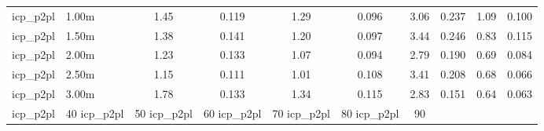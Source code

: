 \begin{tabular}{llcccccccc}
icp\_p2pl & 1.00m & 1.45 & 0.119 & 1.29 & 0.096 & 3.06 & 0.237 & 1.09 & 0.100 \\
icp\_p2pl & 1.50m & 1.38 & 0.141 & 1.20 & 0.097 & 3.44 & 0.246 & 0.83 & 0.115 \\
icp\_p2pl & 2.00m & 1.23 & 0.133 & 1.07 & 0.094 & 2.79 & 0.190 & 0.69 & 0.084 \\
icp\_p2pl & 2.50m & 1.15 & 0.111 & 1.01 & 0.108 & 3.41 & 0.208 & 0.68 & 0.066 \\
icp\_p2pl & 3.00m & 1.78 & 0.133 & 1.34 & 0.115 & 2.83 & 0.151 & 0.64 & 0.063 \\
icp\_p2pl & 40%
icp\_p2pl & 50%
icp\_p2pl & 60%
icp\_p2pl & 70%
icp\_p2pl & 80%
icp\_p2pl & 90%
\bottomrule
\end{tabular}
